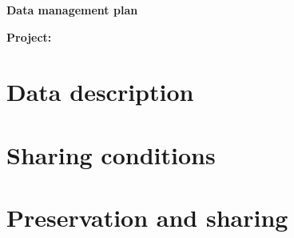 \documentclass[onecolumn,a4paper,12pt]{article}
\newcommand{\DocumentTitle}{%
  Data management plan
}
\begin{document}
\begin{spacing}{2}
  \noindent
  {\LARGE \textbf{\DocumentTitle}}
\end{spacing}

\noindent
\textbf{Project:} \Title



\section{Data description}

\lipsum[1]

\section{Sharing conditions}

\lipsum[2]

\section{Preservation and sharing}

\lipsum[3-4]
\end{document}
